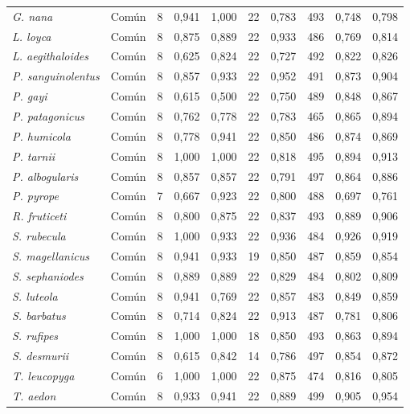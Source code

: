 {\begin{longtable}{@{}l l r r r r r r r r@{}}
    \textit{G. nana} & Común & 8 & 0,941 & 1,000 & 22 & 0,783 & 493 & 0,748 & 0,798 \\
    \textit{L. loyca} & Común & 8 & 0,875 & 0,889 & 22 & 0,933 & 486 & 0,769 & 0,814 \\
    \textit{L. aegithaloides} & Común & 8 & 0,625 & 0,824 & 22 & 0,727 & 492 & 0,822 & 0,826 \\
    \textit{P. sanguinolentus} & Común & 8 & 0,857 & 0,933 & 22 & 0,952 & 491 & 0,873 & 0,904 \\
    \textit{P. gayi} & Común & 8 & 0,615 & 0,500 & 22 & 0,750 & 489 & 0,848 & 0,867 \\
    \textit{P. patagonicus} & Común & 8 & 0,762 & 0,778 & 22 & 0,783 & 465 & 0,865 & 0,894 \\
    \textit{P. humicola} & Común & 8 & 0,778 & 0,941 & 22 & 0,850 & 486 & 0,874 & 0,869 \\
    \textit{P. tarnii} & Común & 8 & 1,000 & 1,000 & 22 & 0,818 & 495 & 0,894 & 0,913 \\
    \textit{P. albogularis} & Común & 8 & 0,857 & 0,857 & 22 & 0,791 & 497 & 0,864 & 0,886 \\
    \textit{P. pyrope} & Común & 7 & 0,667 & 0,923 & 22 & 0,800 & 488 & 0,697 & 0,761 \\
    \textit{R. fruticeti} & Común & 8 & 0,800 & 0,875 & 22 & 0,837 & 493 & 0,889 & 0,906 \\
    \textit{S. rubecula} & Común & 8 & 1,000 & 0,933 & 22 & 0,936 & 484 & 0,926 & 0,919 \\
    \textit{S. magellanicus} & Común & 8 & 0,941 & 0,933 & 19 & 0,850 & 487 & 0,859 & 0,854 \\
    \textit{S. sephaniodes} & Común & 8 & 0,889 & 0,889 & 22 & 0,829 & 484 & 0,802 & 0,809 \\
    \textit{S. luteola} & Común & 8 & 0,941 & 0,769 & 22 & 0,857 & 483 & 0,849 & 0,859 \\
    \textit{S. barbatus} & Común & 8 & 0,714 & 0,824 & 22 & 0,913 & 487 & 0,781 & 0,806 \\
    \textit{S. rufipes} & Común & 8 & 1,000 & 1,000 & 18 & 0,850 & 493 & 0,863 & 0,894 \\
    \textit{S. desmurii} & Común & 8 & 0,615 & 0,842 & 14 & 0,786 & 497 & 0,854 & 0,872 \\
    \textit{T. leucopyga} & Común & 6 & 1,000 & 1,000 & 22 & 0,875 & 474 & 0,816 & 0,805 \\
    \textit{T. aedon} & Común & 8 & 0,933 & 0,941 & 22 & 0,889 & 499 & 0,905 & 0,954 \\

\end{longtable}}
